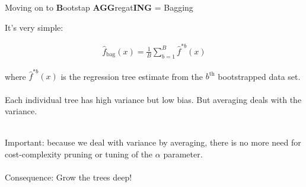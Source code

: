 \documentclass[mathserif, aspectratio=169]{beamer}
\begin{document}
\begin{frame}{Moving on to \textbf{B}ootstap \textbf{AGG}regat\textbf{ING} = Bagging}

It's very simple: 

\begin{align*}
\hat{f}_\text{bag}(x) = \frac{1}{B}\sum_{b=1}^B \hat{f}^{*b}(x)
\end{align*}

where $\hat{f}^{*b}(x)$ is the regression tree estimate from the $b^\text{th}$ bootstrapped data set.\\~\\

Each individual tree has high variance but low bias.  But averaging deals with the variance.\\~\\

\pause

Important: because we deal with variance by averaging, there is no more need for cost-complexity pruning or tuning of the $\alpha$ parameter. \\~\\

Consequence: Grow the trees deep!

\end{frame}
\end{document}
